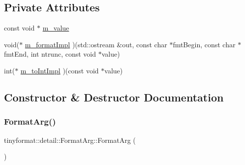 \subsection*{Private Attributes}
\begin{DoxyCompactItemize}
\item 
const void $\ast$ \mbox{\hyperlink{classtinyformat_1_1detail_1_1_format_arg_ad7630a7d1e68ac56e46e03722156056a}{m\+\_\+value}}
\item 
void($\ast$ \mbox{\hyperlink{classtinyformat_1_1detail_1_1_format_arg_a3e1114e7a277020906bfd4588ff9b6fc}{m\+\_\+format\+Impl}} )(std\+::ostream \&out, const char $\ast$fmt\+Begin, const char $\ast$fmt\+End, int ntrunc, const void $\ast$value)
\item 
int($\ast$ \mbox{\hyperlink{classtinyformat_1_1detail_1_1_format_arg_a999e592d6235d5dbdf0f46cad769f220}{m\+\_\+to\+Int\+Impl}} )(const void $\ast$value)
\end{DoxyCompactItemize}


\subsection{Constructor \& Destructor Documentation}
\mbox{\label{classtinyformat_1_1detail_1_1_format_arg_aa6c926179f24546f26bff058d1a77d39}} 
\subsubsection{\texorpdfstring{Format\+Arg()}{FormatArg()}\hspace{0.1cm}{\footnotesize\ttfamily [1/2]}}
{\footnotesize\ttfamily tinyformat\+::detail\+::\+Format\+Arg\+::\+Format\+Arg (\begin{DoxyParamCaption}{ }\end{DoxyParamCaption})\hspace{0.3cm}{\ttfamily [inline]}}

\mbox{\label{classtinyformat_1_1detail_1_1_format_arg_adec80164e93744f53ae7ecc6a5f6af27}} 

